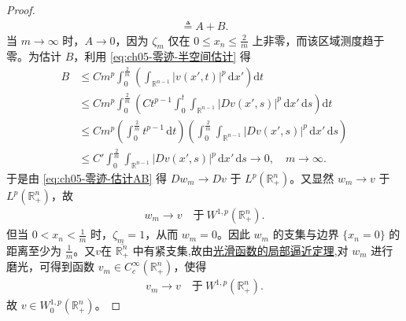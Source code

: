 \documentclass[../../main.tex]{subfiles}%
\begin{document}
\begin{proof}
\begin{align}
\triangleq A+B.
\end{align}
当 $m\to\infty$ 时，$A\to 0$，因为 $\zeta_{m}$ 仅在 $0\leqslant x_{n}\leqslant \frac{2}{m}$ 上非零，而该区域测度趋于零。为估计 $B$，利用 \eqref{eq:ch05-零迹-半空间估计} 得
\begin{align*}
B
&\leqslant Cm^{p}\int_{0}^{\frac{2}{m}}\left(\int_{\mathbb{R}^{n-1}}|v(x',t)|^{p}\,\mathrm{d}x'\right)\mathrm{d}t\\
&\leqslant Cm^{p}\int_{0}^{\frac{2}{m}}\left(Ct^{p-1}\int_{0}^{t}\int_{\mathbb{R}^{n-1}}|Dv(x',s)|^{p}\,\mathrm{d}x'\,\mathrm{d}s\right)\mathrm{d}t\\
&\leqslant Cm^{p}\left(\int_{0}^{\frac{2}{m}}t^{p-1}\,\mathrm{d}t\right)
\left(\int_{0}^{\frac{2}{m}}\int_{\mathbb{R}^{n-1}}|Dv(x',s)|^{p}\,\mathrm{d}x'\,\mathrm{d}s\right)\\
&\leqslant C'\int_{0}^{\frac{2}{m}}\int_{\mathbb{R}^{n-1}}|Dv(x',s)|^{p}\,\mathrm{d}x'\,\mathrm{d}s\to 0,\quad m\to\infty.
\end{align*}
于是由 \eqref{eq:ch05-零迹-估计AB} 得 $Dw_{m}\to Dv$ 于 $L^{p}(\mathbb{R}^{n}_{+})$。又显然 $w_{m}\to v$ 于 $L^{p}(\mathbb{R}^{n}_{+})$，故
\begin{align*}
w_{m}\to v\quad\text{于}\ W^{1,p}(\mathbb{R}^{n}_{+}).
\end{align*}
但当 $0<x_{n}<\frac{1}{m}$ 时，$\zeta_{m}=1$，从而 $w_{m}=0$。因此 $w_{m}$ 的支集与边界 $\{x_{n}=0\}$ 的距离至少为 $\frac{1}{m}$。又$v$在 $\overline{\mathbb{R}^{n}_{+}}$ 中有紧支集,故由\hyperref[theorem:ch05-光滑函数的局部逼近定理]{光滑函数的局部逼近定理},对 $w_{m}$ 进行磨光，可得到函数 $v_{m}\in C^{\infty}_{c}(\mathbb{R}^{n}_{+})$，使得
\begin{align*}
v_{m}\to v\quad\text{于}\ W^{1,p}(\mathbb{R}^{n}_{+}).
\end{align*}
故 $v\in W^{1,p}_{0}(\mathbb{R}^{n}_{+})$。


\end{proof}
\end{document}

